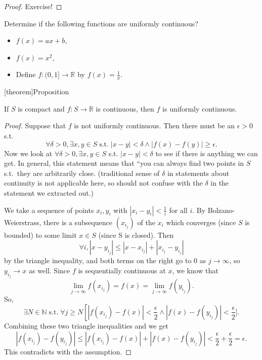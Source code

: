 \documentclass[12pt]{report}
\theoremstyle{definition}
\begin{document}
\begin{proof}
    Exercise!
\end{proof} 

\begin{ex}
    Determine if the following functions are uniformly continuous?
    \begin{itemize}
        \item $f(x) = ax + b$,
        \item $f(x) = x^{2}$,
        \item Define $f:(0,1]\rightarrow\mathbb{R}$ by %
            $f(x) = \frac{1}{x}$.
    \end{itemize} 
\end{ex} 

[theorem]{Proposition}
\begin{compact and continuous is uniformly continuous}
    If $S$ is compact and $f:S\rightarrow\mathbb{R}$ is continuous, then $f$ is 
    uniformly continuous.
\end{compact and continuous is uniformly continuous}

\begin{proof}
    Suppose that $f$ is not uniformly continuous.
    Then there must be an $\epsilon > 0$ s.t. \[
        \forall \delta > 0, \exists x,y\in S \;\text{s.t.}\;
        |x-y|<\delta \wedge |f(x)-f(y)|\ge{}\epsilon.
    \]
    Now we look at $\forall \delta > 0, \exists x,y\in S$ s.t. $|x-y|<\delta$ 
    to see if there is anything we can get.
    In general, this statement means that ``you can always
    find two points in $S$ s.t.\ they are arbitrarily close.
    (traditional sense of $\delta$ in statements about continuity
    is not applicable here, so should not confuse with the $\delta$
    in the statement we extracted out.)

    \medskip\noindent
    We take a sequence of points $x_i, y_i$ with $|x_i-y_i|<\frac{1}{i}$
    for all $i$. By Bolzano-Weierstrass, there is a subsequence
    $(x_{i_j})$ of the $x_i$ which converges (since $S$ is bounded)
    to some limit $x\in S$ (since S is closed). Then \[
        \forall i, |x-y_{i_j}|\le|x-x_{i_j}|+|x_{i_j}-y_{i_j}|
    \]by the triangle inequality, and both terms on the right
    go to 0 as $j\rightarrow\infty$, so $y_{i_j}\rightarrow x$ as well.  
    Since $f$ is sequentially continuous at $x$, we know that \[
        \lim_{j\rightarrow\infty}f(x_{i_j}) = f(x) =
        \lim_{j\rightarrow\infty}f(y_{i_j}).
    \]
    So,\[
        \exists N\in\mathbb{N} \;\text{s.t.}\; \forall j \ge N
        \left[|f(x_{i_j})-f(x)|<\frac{\epsilon}{2} \wedge
        |f(x)-f(y_{i_j})|<\frac{\epsilon}{2}].
    \]
    Combining these two triangle inequalities and we get\[
        |f(x_{i_j})-f(y_{i_j})|
        \le|f(x_{i_j})-f(x)| + |f(x)-f(y_{i_j})|
        < \frac{\epsilon}{2}+\frac{\epsilon}{2} = \epsilon.
    \]
    This contradicts with the assumption.
\end{proof} 
\end{document}
